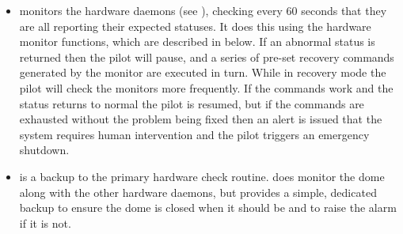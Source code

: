 \begin{colsection}
\begin{itemize}
\item {} monitors the hardware daemons (see ), checking every 60 seconds that they are all reporting their expected statuses. It does this using the hardware monitor functions, which are described in  below. If an abnormal status is returned then the pilot will pause, and a series of pre-set recovery commands generated by the monitor are executed in turn. While in recovery mode the pilot will check the monitors more frequently. If the commands work and the status returns to normal the pilot is resumed, but if the commands are exhausted without the problem being fixed then an alert is issued that the system requires human intervention and the pilot triggers an emergency shutdown.

\item {} is a backup to the primary hardware check routine.  does monitor the dome along with the other hardware daemons, but  provides a simple, dedicated backup to ensure the dome is closed when it should be and to raise the alarm if it is not.

\end{itemize}

\newpage

\end{colsection}


